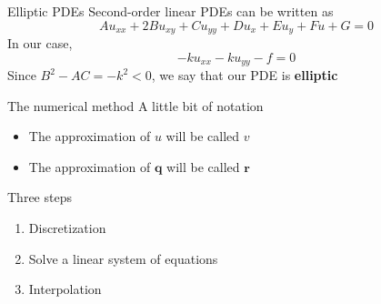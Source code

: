 \documentclass{beamer}
\begin{document}
    \begin{frame}{Elliptic PDEs}
        Second-order linear PDEs can be written as
        \begin{equation*}
            Au_{xx} + 2Bu_{xy} + Cu_{yy} + Du_x + Eu_y + Fu + G = 0
        \end{equation*}
        In our case,
        \begin{equation*}
            -ku_{xx} -ku_{yy} - f = 0
        \end{equation*}
        Since $B^2 - AC = -k^2 < 0$, we say that our PDE is \textbf{elliptic}
    \end{frame}

    \begin{frame}{The numerical method}
        A little bit of notation
        \begin{itemize}
            \item The approximation of $u$ will be called $v$
            \item The approximation of $\bm{q}$ will be called $\bm{r}$
        \end{itemize}
        Three steps
        \begin{enumerate}
            \item Discretization
            \item Solve a linear system of equations
            \item Interpolation
        \end{enumerate}
    \end{frame}
\end{document}
